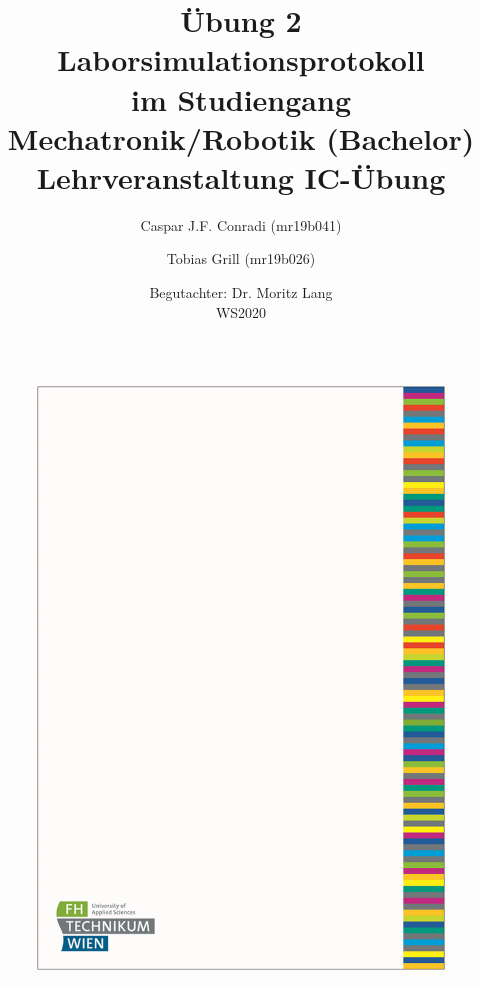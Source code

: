 \documentclass[a4paper]{article}
\title{{\huge Übung 2}\\Laborsimulationsprotokoll\\ \large im Studiengang Mechatronik/Robotik (Bachelor) Lehrveranstaltung IC-Übung}
\date{Begutachter: Dr. Moritz Lang \\ WS2020}
\author{Caspar J.F. Conradi (mr19b041) \and Tobias Grill (mr19b026)}
\begin{document}
    \maketitle
    \newpage



    
    \begin{figure}[h!] %
		\includegraphics[width=\linewidth]{Image/Titelblatt.png}
	\end{figure}

    


    \newpage
    \tableofcontents
    \newpage
\end{document}
